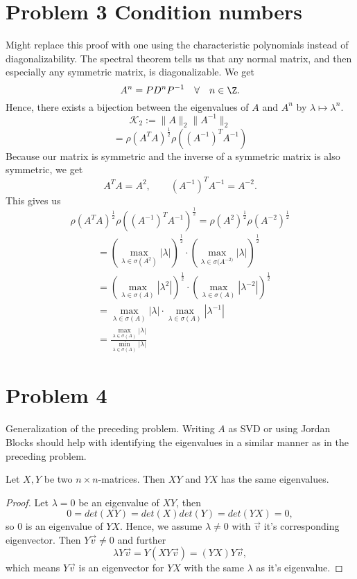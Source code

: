 \section{Problem 3 Condition numbers}
Might replace this proof with one using the characteristic polynomials instead of diagonalizability.
\newline The spectral theorem tells us that any normal matrix, and then especially any symmetric matrix, is diagonalizable. We get
  $$ A^n = PD^nP^{-1} \quad \forall \quad n \in \Z .$$
Hence, there exists a bijection between the eigenvalues of $A$ and $A^n$ by $\lambda \mapsto \lambda^n$.
  $$ \mathcal{K}_2:= \| A \|_2 \| A^{-1} \|_2 $$
  $$ = \rho(A^TA)^{\frac{1}{2}}\rho((A^{-1})^TA^{-1}) $$
Because our matrix is symmetric and the inverse of a symmetric matrix is also symmetric, we get
  $$ A^TA = A^2, \qquad (A^{-1})^TA^{-1}=A^{-2}. $$
This gives us
  $$ \rho(A^TA)^{\frac{1}{2}}\rho((A^{-1})^TA^{-1})^{\frac{1}{2}} = \rho(A^2)^{\frac{1}{2}}\rho(A^{-2})^{\frac{1}{2}} $$
\begin{align*}
  & = \left(\max_{\lambda\in \sigma(A^2)}|\lambda|\right)^{\frac{1}{2}} \cdot \left(\max_{\lambda\in\sigma(A^{-2)}}|\lambda|\right)^{\frac{1}{2}} \\
  & = \left(\max_{\lambda\in\sigma(A)}|\lambda^2|\right)^{\frac{1}{2}} \cdot \left(\max_{\lambda\in\sigma(A)}|\lambda^{-2}|\right)^{\frac{1}{2}} \\
  & = \max_{\lambda\in\sigma(A)}|\lambda| \cdot \max_{\lambda\in\sigma(A)}|\lambda^{-1}| \\
  & = \frac{\max_{\lambda\in\sigma(A)}|\lambda| }{ \min_{\lambda\in\sigma(A)}|\lambda| }
\end{align*}

\section{Problem 4 }
Generalization of the preceding problem. Writing $A$ as SVD or using Jordan Blocks should help with identifying the eigenvalues in a similar manner as in the preceding problem.
\begin{lemma}\label{eigenvaluescommute}
  Let $X,Y$ be two $n\times n$-matrices. Then $XY$ and $YX$ has the same eigenvalues.
\end{lemma}
\begin{proof}
  Let $\lambda=0$ be an eigenvalue of $XY$, then
    \begin{equation} 0 = det(XY)=det(X)det(Y)=det(YX) = 0, \end{equation}
  so $0$ is an eigenvalue of $YX$. Hence, we assume $\lambda\neq 0$ with $\vec{v}$ it's corresponding eigenvector. Then $Y\vec{v}\neq 0$ and further
    \begin{equation} \lambda Y\vec{v}=Y(XY\vec{v})=(YX)Y\vec{v}, \end{equation}
  which means $Y\vec{v}$ is an eigenvector for $YX$ with the same $\lambda$ as it's eigenvalue.
\end{proof}

